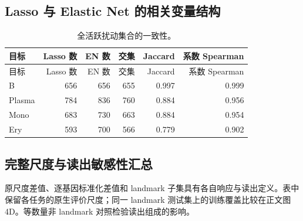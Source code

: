 \clearpage\subsection{Lasso 与 Elastic Net 的相关变量结构}
{\footnotesize\linespread{1}\selectfont\setlength{\tabcolsep}{4pt}\renewcommand{\arraystretch}{1.08}\begin{longtable}{lrrrrr}\caption{全活跃扰动集合的一致性。}\\\toprule 目标 & Lasso 数 & EN 数 & 交集 & Jaccard & 系数 Spearman\\\midrule\endfirsthead\toprule 目标 & Lasso 数 & EN 数 & 交集 & Jaccard & 系数 Spearman\\\midrule\endhead
B & 656 & 656 & 655 & 0.997 & 0.999\\
Plasma & 784 & 836 & 760 & 0.884 & 0.956\\
Mono & 683 & 730 & 663 & 0.884 & 0.954\\
Ery & 593 & 700 & 566 & 0.779 & 0.902\\
\bottomrule\end{longtable}}
\clearpage\subsection{完整尺度与读出敏感性汇总}
原尺度差值、逐基因标准化差值和 landmark 子集具有各自响应与读出定义。表中保留各任务的原生评价尺度；同一 landmark 测试集上的训练覆盖比较在正文图 4D。等数量非 landmark 对照检验读出组成的影响。
